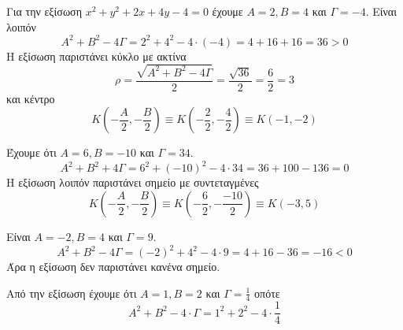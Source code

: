 \begin{alist}
\item Για την εξίσωση $ x^2+y^2+2x+4y-4=0 $ έχουμε $ A=2,B=4 $ και $ \varGamma=-4 $. Είναι λοιπόν
\[ A^2+B^2-4\varGamma=2^2+4^2-4\cdot(-4)=4+16+16=36>0 \]
Η εξίσωση παριστάνει κύκλο με ακτίνα
\[ \rho=\frac{\sqrt{A^2+B^2-4\varGamma}}{2}=\frac{\sqrt{36}}{2}=\frac{6}{2}=3 \]
και κέντρο
\[ K\left(-\frac{A}{2},-\frac{B}{2}\right)\equiv K\left(-\frac{2}{2},-\frac{4}{2}\right)\equiv K(-1,-2) \]
\item Έχουμε ότι $ A=6,B=-10 $ και $ \varGamma=34 $.
\[ A^2+B^2+4\varGamma=6^2+(-10)^2-4\cdot 34=36+100-136=0 \]
Η εξίσωση λοιπόν παριστάνει σημείο με συντεταγμένες
\[ K\left(-\frac{A}{2},-\frac{B}{2}\right)\equiv K\left(-\frac{6}{2},-\frac{-10}{2}\right)\equiv K(-3,5) \]
\item Είναι $ A=-2,B=4 $ και $ \varGamma=9 $.
\[ A^2+B^2-4\varGamma=(-2)^2+4^2-4\cdot 9=4+16-36=-16<0 \]
Άρα η εξίσωση δεν παριστάνει κανένα σημείο.
\item Από την εξίσωση έχουμε ότι $ A=1,B=2 $ και $ \varGamma=\frac{1}{4} $ οπότε
\[ A^2+B^2-4\cdot\varGamma=1^2+2^2-4\cdot\frac{1}{4} \]
\end{alist}
